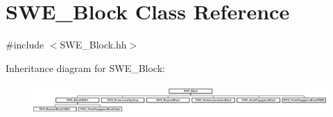 \hypertarget{classSWE__Block}{\section{S\-W\-E\-\_\-\-Block Class Reference}
\label{classSWE__Block}
}


{\ttfamily \#include $<$S\-W\-E\-\_\-\-Block.\-hh$>$}

Inheritance diagram for S\-W\-E\-\_\-\-Block\-:\begin{figure}[H]
\begin{center}
\leavevmode
\includegraphics[height=1.111111cm]{classSWE__Block}
\end{center}
\end{figure}
